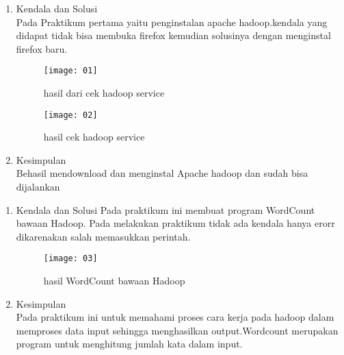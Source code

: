 
\begin{enumerate}
\item Kendala dan Solusi\\
Pada Praktikum pertama yaitu penginstalan apache hadoop.kendala yang didapat tidak bisa membuka firefox kemudian solusinya dengan menginstal firefox baru.

\begin{figure}[!ht]
\texttt{[image: 01]}
\caption{hasil dari cek hadoop service}
\label{gam:perkuliahan-25-11}
\end{figure}


\begin{figure}[!ht]
\texttt{[image: 02]}
\caption{hasil cek hadoop service}
\label{gam:perkuliahan-25-11}
\end{figure}

\item Kesimpulan\\
Behasil mendownload dan menginstal Apache hadoop dan sudah bisa dijalankan

\end{enumerate}

\begin{enumerate}

\item Kendala dan Solusi
\newpage
Pada praktikum ini membuat program WordCount bawaan Hadoop. Pada melakukan praktikum tidak ada kendala hanya erorr dikarenakan salah memasukkan perintah.

\begin{figure}[!ht]
\texttt{[image: 03]}
\caption{hasil WordCount bawaan Hadoop}
\label{gam:perkuliahan-25-11}
\end{figure}

\item Kesimpulan\\
Pada praktikum ini untuk memahami proses cara kerja pada hadoop dalam memproses data input sehingga menghasilkan output.Wordcount merupakan program untuk menghitung jumlah kata dalam input.

\end{enumerate}

